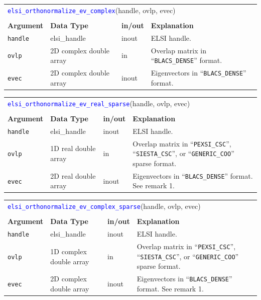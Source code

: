 \documentclass{report}
\newcommand{\api}[1]{\textcolor{blue}{\texttt{#1}}}
\begin{document}
\begin{tabular}[]{|p{20mm}|p{40mm}|p{10mm}|p{92mm}|}
\multicolumn{4}{l}{\api{elsi\_orthonormalize\_ev\_complex}(handle, ovlp, evec)}\\
\multicolumn{4}{l}{}\\
\hline
\multicolumn{1}{|l|}{\textbf{Argument}} & \multicolumn{1}{l|}{\textbf{Data Type}} & \multicolumn{1}{l|}{\textbf{in/out}} & \multicolumn{1}{l|}{\textbf{Explanation}}\\
\hline
\texttt{handle} & elsi\_handle            & inout & ELSI handle.\\
\hline
\texttt{ovlp}   & 2D complex double array & in    & Overlap matrix in ``\texttt{BLACS\_DENSE}'' format.\\
\hline
\texttt{evec}   & 2D complex double array & inout & Eigenvectors in ``\texttt{BLACS\_DENSE}'' format.\\
\hline
\end{tabular}

\begin{tabular}[]{|p{20mm}|p{40mm}|p{10mm}|p{92mm}|}
\multicolumn{4}{l}{\api{elsi\_orthonormalize\_ev\_real\_sparse}(handle, ovlp, evec)}\\
\multicolumn{4}{l}{}\\
\hline
\multicolumn{1}{|l|}{\textbf{Argument}} & \multicolumn{1}{l|}{\textbf{Data Type}} & \multicolumn{1}{l|}{\textbf{in/out}} & \multicolumn{1}{l|}{\textbf{Explanation}}\\
\hline
\texttt{handle} & elsi\_handle         & inout & ELSI handle.\\
\hline
\texttt{ovlp}   & 1D real double array & in    & Overlap matrix in ``\texttt{PEXSI\_CSC}'', ``\texttt{SIESTA\_CSC}'', or ``\texttt{GENERIC\_COO}'' sparse format.\\
\hline
\texttt{evec}   & 2D real double array & inout & Eigenvectors in ``\texttt{BLACS\_DENSE}'' format. See remark 1.\\
\hline
\end{tabular}

\begin{tabular}[]{|p{20mm}|p{40mm}|p{10mm}|p{92mm}|}
\multicolumn{4}{l}{\api{elsi\_orthonormalize\_ev\_complex\_sparse}(handle, ovlp, evec)}\\
\multicolumn{4}{l}{}\\
\hline
\multicolumn{1}{|l|}{\textbf{Argument}} & \multicolumn{1}{l|}{\textbf{Data Type}} & \multicolumn{1}{l|}{\textbf{in/out}} & \multicolumn{1}{l|}{\textbf{Explanation}}\\
\hline
\texttt{handle} & elsi\_handle            & inout & ELSI handle.\\
\hline
\texttt{ovlp}   & 1D complex double array & in    & Overlap matrix in ``\texttt{PEXSI\_CSC}'', ``\texttt{SIESTA\_CSC}'', or ``\texttt{GENERIC\_COO}'' sparse format.\\
\hline
\texttt{evec}   & 2D complex double array & inout & Eigenvectors in ``\texttt{BLACS\_DENSE}'' format. See remark 1.\\
\hline
\end{tabular}
\end{document}
